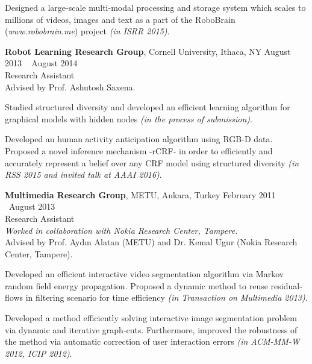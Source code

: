 \documentclass[margin,line,10pt]{resume}
\begin{document}
\begin{resume}
  Designed a large-scale multi-modal processing and storage system which scales to millions of videos, images and text as a part of the RoboBrain (\emph{www.robobrain.me}) project \emph{(in ISRR 2015)}.


    \textbf{Robot Learning Research Group}, Cornell University, Ithaca, NY \hfill August 2013 \textendash ~ August 2014\vspace{0mm}\\\vspace{0mm}
	\hspace{-1mm}Research Assistant  \hfill \vspace{1.5mm} \\
	Advised by Prof. Ashutosh Saxena.

	Studied structured diversity and developed an efficient learning algorithm for graphical models with hidden nodes \emph{(in the process of submission)}.

	Developed an human activity anticipation algorithm using RGB-D data. Proposed a novel inference mechanism -rCRF- in order to efficiently and accurately represent a belief over any CRF model using structured diversity \emph{(in RSS 2015 and invited talk at AAAI 2016)}.

    \textbf{Multimedia Research Group}, METU, Ankara, Turkey \hfill February 2011 \textendash ~August 2013\vspace{0mm}\\\vspace{0mm}
	\hspace{-1mm}Research Assistant  \hfill \vspace{2mm}\\\vspace{0mm}
	\hspace{-1mm}\emph{Worked in collaboration with Nokia Research Center, Tampere.} \\
	Advised by Prof. Ayd\i n Alatan (METU) and Dr. Kemal Ugur (Nokia Research Center, Tampere).

	Developed an efficient interactive video segmentation algorithm via Markov random field energy propagation. Proposed a dynamic method to reuse residual-flows in filtering scenario for time efficiency \emph{(in Transaction on Multimedia 2013)}.

	Developed a method efficiently solving interactive image segmentation problem via dynamic and iterative graph-cuts. Furthermore, improved the robustness of the method via automatic correction of user interaction errors \emph{(in ACM-MM-W 2012, ICIP 2012)}.
	

\end{resume}
\end{document}
